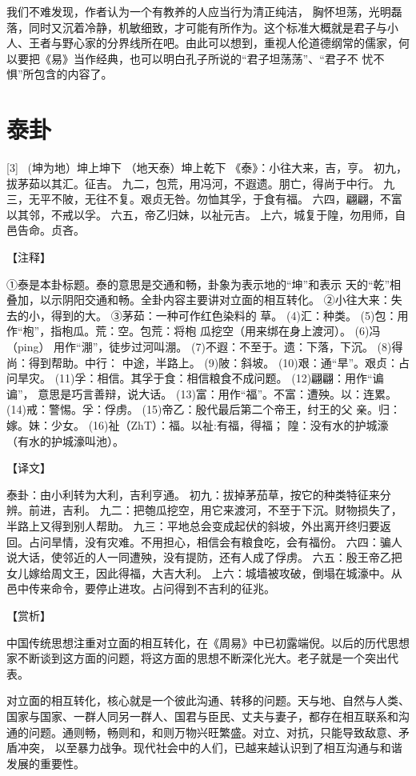 \documentclass[12pt,UTF8]{ctexbook}
\begin{document}
我们不难发现，作者认为一个有教养的人应当行为清正纯洁， 胸怀坦荡，光明磊落，同时又沉着冷静，机敏细致，才可能有所作为。这个标准大概就是君子与小人、王者与野心家的分界线所在吧。由此可以想到，重视人伦道德纲常的儒家，何以要把《易》当作经典，也可以明白孔子所说的“君子坦荡荡”、“君子不 忧不惧”所包含的内容了。

\chapter{泰卦}
[3] \ (坤为地）坤上坤下
（地天泰）坤上乾下
《泰》：小往大来，吉，亨。
初九，拔茅茹以其汇。征吉。
九二，包荒，用冯河，不遐遗。朋亡，得尚于中行。
九三，无平不陂，无往不复。艰贞无咎。勿恤其孚，于食有福。
六四，翩翩，不富以其邻，不戒以孚。
六五，帝乙归妹，以祉元吉。
上六，城复于隍，勿用师，自邑告命。贞吝。

【注释】

①泰是本卦标题。泰的意思是交通和畅，卦象为表示地的“坤”和表示 天的“乾”相叠加，以示阴阳交通和畅。全卦内容主要讲对立面的相互转化。
②小往大来：失去的小，得到的大。
③茅茹：一种可作红色染料的 草。
(4)汇：种类。
(5)包：用作“枹”，指枹瓜。荒：空。包荒：将枹 瓜挖空（用来绑在身上渡河）。
(6)冯（ping） 用作“淜”，徒步过河叫淜。
(7)不遐：不至于。遗：下落，下沉。
(8)得尚：得到帮助。中行： 中途，半路上。
(9)陂：斜坡。
(10)艰：通“旱”。艰贞：占问旱灾。
(11)孚：相信。其孚于食：相信粮食不成问题。
(12)翩翩：用作“谝谝”， 意思是巧言善辩，说大话。
(13)富：用作“福”。不富：遭殃。以：连累。
(14)戒：警惕。孚：俘虏。
(15)帝乙：殷代最后第二个帝王，纣王的父 亲。归：嫁。妹：少女。
(16)祉（ZhT）：福。以祉:有福，得福； 隍：没有水的护城濠（有水的护城濠叫池）。

【译文】

泰卦：由小利转为大利，吉利亨通。
初九：拔掉茅茄草，按它的种类特征来分辨。前进，吉利。
九二：把匏瓜挖空，用它来渡河，不至于下沉。财物损失了， 半路上又得到别人帮助。
九三：平地总会变成起伏的斜坡，外出离开终归要返回。占问旱情，没有灾难。不用担心，相信会有粮食吃，会有福份。
六四：骗人说大话，使邻近的人一同遭殃，没有提防，还有人成了俘虏。
六五：殷王帝乙把女儿嫁给周文王，因此得福，大吉大利。
上六：城墙被攻破，倒塌在城濠中。从邑中传来命令，要停止进攻。占问得到不吉利的征兆。

【赏析】

中国传统思想注重对立面的相互转化，在《周易》中已初露端倪。以后的历代思想家不断谈到这方面的问题，将这方面的思想不断深化光大。老子就是一个突出代表。

对立面的相互转化，核心就是一个彼此沟通、转移的问题。天与地、自然与人类、国家与国家、一群人同另一群人、国君与臣民、丈夫与妻子，都存在相互联系和沟通的问题。通则畅，畅则和，和则万物兴旺繁盛。对立、对抗，只能导致敌意、矛盾冲突， 以至暴力战争。现代社会中的人们，已越来越认识到了相互沟通与和谐发展的重要性。
\end{document}

